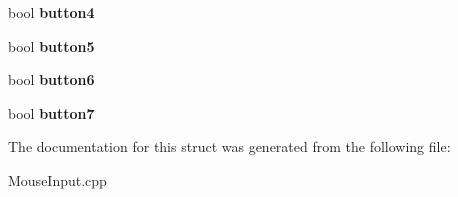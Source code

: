 \begin{DoxyCompactItemize}
\item 
\hypertarget{struct_mouse_input_1_1_buffered_mouse_aa52778e57491c53165b14a7fdc7d1312}{bool {\bfseries button4}}\label{struct_mouse_input_1_1_buffered_mouse_aa52778e57491c53165b14a7fdc7d1312}

\item 
\hypertarget{struct_mouse_input_1_1_buffered_mouse_aaea5b4f545848dde0c2523b30c269a0d}{bool {\bfseries button5}}\label{struct_mouse_input_1_1_buffered_mouse_aaea5b4f545848dde0c2523b30c269a0d}

\item 
\hypertarget{struct_mouse_input_1_1_buffered_mouse_a12e07bb18c652cc0256ea75dd830ca82}{bool {\bfseries button6}}\label{struct_mouse_input_1_1_buffered_mouse_a12e07bb18c652cc0256ea75dd830ca82}

\item 
\hypertarget{struct_mouse_input_1_1_buffered_mouse_a7c99360773af2e1f4cdf911c4e6a9925}{bool {\bfseries button7}}\label{struct_mouse_input_1_1_buffered_mouse_a7c99360773af2e1f4cdf911c4e6a9925}

\end{DoxyCompactItemize}


The documentation for this struct was generated from the following file\-:\begin{DoxyCompactItemize}
\item 
Mouse\-Input.\-cpp\end{DoxyCompactItemize}
